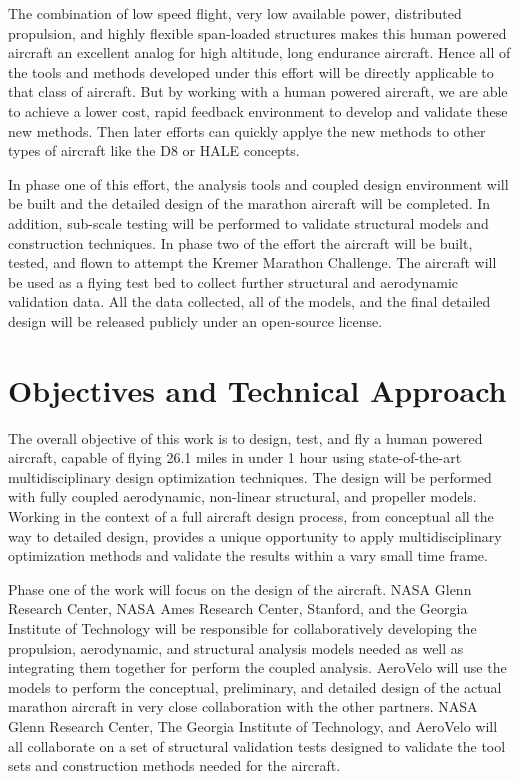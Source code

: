 \documentclass[]{aiaa-tc}
\begin{document}
    The combination of low speed flight, very low available power, distributed propulsion, and highly 
    flexible span-loaded structures makes this human powered aircraft an excellent analog for 
    high altitude, long endurance aircraft. Hence all of the tools and methods developed under 
    this effort will be directly applicable to that class of aircraft. But by working with a human powered 
    aircraft, we are able to achieve a lower cost, rapid feedback environment to develop and validate these 
    new methods. Then later efforts can quickly applye the new methods to other types of aircraft like the D8
    or HALE concepts. 

    In phase one of this effort, the analysis tools and coupled design environment will be built and 
    the detailed design of the marathon aircraft will be completed. In addition, sub-scale testing will be 
    performed to validate structural models and construction techniques. In phase two of the effort
    the aircraft will be built, tested, and flown to attempt the Kremer Marathon Challenge. The aircraft will be 
    used as a flying test bed to collect further structural and aerodynamic validation data. All the data collected, 
    all of the models, and the final detailed design will be released publicly under an open-source license.

  \section{Objectives and Technical Approach}

    The overall objective of this work is to design, test, and fly a human powered aircraft, 
    capable of flying 26.1 miles in under 1 hour using state-of-the-art multidisciplinary 
    design optimization techniques. The design will be performed with fully coupled
    aerodynamic, non-linear structural, and propeller models. Working in the context of 
    a full aircraft design process, from conceptual all the way to detailed design, 
    provides a unique opportunity to apply multidisciplinary optimization methods and validate
    the results within a vary small time frame. 

    Phase one of the work will focus on the design of the aircraft. NASA Glenn Research Center, 
    NASA Ames Research Center, Stanford, and the Georgia Institute of Technology will be responsible 
    for collaboratively developing the propulsion, aerodynamic, and structural analysis 
    models needed as well as integrating them together for perform the coupled analysis. AeroVelo will
    use the models to perform the conceptual, preliminary, and detailed design of the actual marathon 
    aircraft in very close collaboration with the other partners. NASA Glenn Research Center, 
    The Georgia Institute of Technology, and AeroVelo will all collaborate on a set of structural validation 
    tests designed to validate the tool sets and construction methods needed for the aircraft. 
\end{document}
